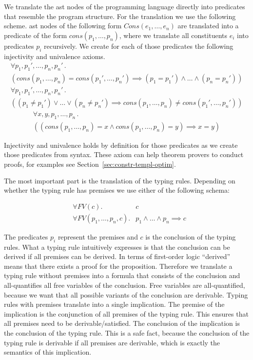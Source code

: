 We translate the \gls{ast} nodes of the programming language directly
into predicates that resemble the program structure. For the
translation we use the following scheme. \gls{ast} nodes of the
following form $Cons(e_1, \dots, e_n)$ are translated into a predicate
of the form $cons(p_1, \dots, p_n)$, where we translate all
constituents $e_i$ into predicates $p_i$ recursively. We create for
each of those predicates the following injectivity and univalence
axioms.
\begin{multline}
  \forall p_1,p_1', \dots, p_n, p_n' \,.\, \\ (cons(p_1, \dots, p_n) =
  cons(p_1', \dots, p_n') \implies (p_1 = p_1') \land \dots \land (p_n
  = p_n'))
\end{multline}
\begin{multline}
  \forall p_1,p_1', \dots, p_n, p_n' \,.\, \\ ((p_1 \neq p_1')
  \lor \dots \lor (p_n \neq p_n') \implies cons(p_1, \dots, p_n) \neq
  cons(p_1', \dots, p_n'))
\end{multline}
\begin{multline}
  \forall x, y, p_1, \dots, p_n \,.\, \\ ((cons(p_1, \dots, p_n) = x
  \land cons(p_1, \dots, p_n) = y) \implies x = y)
\end{multline}

Injectivity and univalence holds by definition for those predicates as
we create those predicates from syntax. These axiom can help theorem
provers to conduct proofs, for examples see
Section~\ref{sec:constr-templ-optim}.

The most important part is the translation of the typing
rules. Depending on whether the typing rule has premises we use either
of the following schema:

\begin{align}
  &\forall FV(c) .& c \\
  &\forall FV(p_1,\dots, p_n, c) .& p_1 \land \dots \land p_n \implies
  c
\label{formula:typing-rule}
\end{align}

The predicates $p_i$ represent the premises and $c$ is the conclusion
of the typing rules. What a typing rule intuitively expresses is that
the conclusion can be derived if all premises can be derived. In terms
of first-order logic ``derived'' means that there exists a proof for
the proposition. Therefore we translate a typing rule without premises
into a formula that consists of the conclusion and all-quantifies all
free variables of the conclusion. Free variables are all-quantified,
because we want that all possible variants of the conclusion are
derivable. Typing rules with premises translate into a single
implication. The premise of the implication is the conjunction of all
premises of the typing rule. This ensures that all premises need to be
derivable/satisfied. The conclusion of the implication is the
conclusion of the typing rule. This is a safe fact, because the
conclusion of the typing rule is derivable if all premises are
derivable, which is exactly the semantics of this implication.

